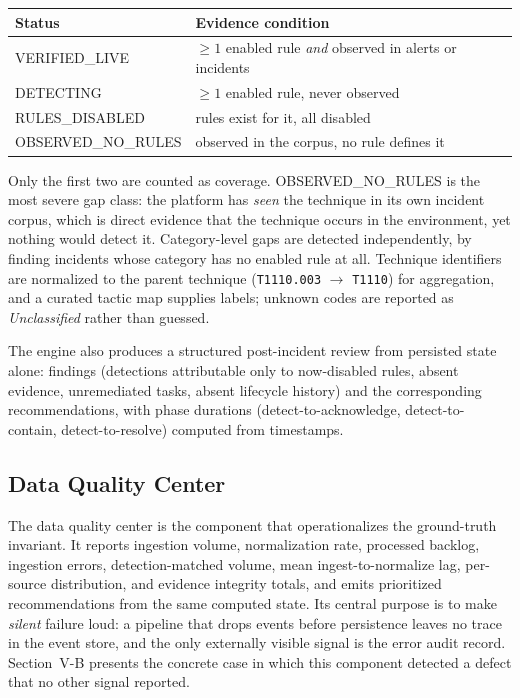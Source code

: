 \documentclass[conference]{IEEEtran}
\begin{document}
\begin{center}
\scriptsize
\setlength{\tabcolsep}{2pt}
\begin{tabular}{@{}p{}p{}@{}}
\toprule
\textbf{Status} & \textbf{Evidence condition} \\
\midrule
VERIFIED\_LIVE & $\geq 1$ enabled rule \emph{and} observed in alerts or incidents \\
DETECTING & $\geq 1$ enabled rule, never observed \\
RULES\_DISABLED & rules exist for it, all disabled \\
OBSERVED\_NO\_RULES & observed in the corpus, no rule defines it \\
\bottomrule
\end{tabular}
\end{center}

Only the first two are counted as coverage. OBSERVED\_NO\_RULES is the most
severe gap class: the platform has \emph{seen} the technique in its own
incident corpus, which is direct evidence that the technique occurs in the
environment, yet nothing would detect it. Category-level gaps are detected
independently, by finding incidents whose category has no enabled rule at
all. Technique identifiers are normalized to the parent technique
(\texttt{T1110.003} $\rightarrow$ \texttt{T1110}) for aggregation, and a
curated tactic map supplies labels; unknown codes are reported as
\emph{Unclassified} rather than guessed.

The engine also produces a structured post-incident review from persisted
state alone: findings (detections attributable only to now-disabled rules,
absent evidence, unremediated tasks, absent lifecycle history) and the
corresponding recommendations, with phase durations
(detect-to-acknowledge, detect-to-contain, detect-to-resolve) computed from
timestamps.

\subsection{Data Quality Center}

The data quality center is the component that operationalizes the
ground-truth invariant. It reports ingestion volume, normalization rate,
processed backlog, ingestion errors, detection-matched volume, mean
ingest-to-normalize lag, per-source distribution, and evidence integrity
totals, and emits prioritized recommendations from the same computed state.
Its central purpose is to make \emph{silent} failure loud: a pipeline that
drops events before persistence leaves no trace in the event store, and the
only externally visible signal is the error audit record. Section~V-B
presents the concrete case in which this component detected a defect that no
other signal reported.
\end{document}
